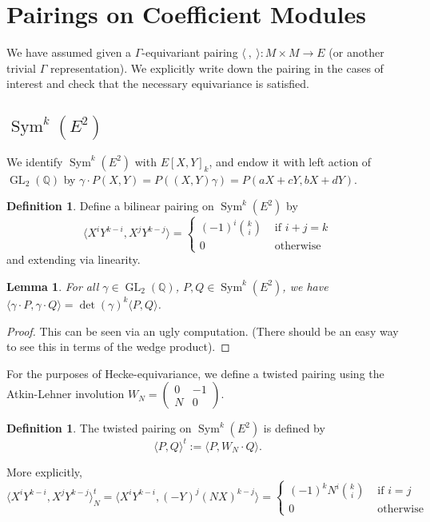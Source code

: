 \documentclass[10pt]{amsart}
\theoremstyle{plain}
\newtheorem{lemma}[theorem]{Lemma}
\theoremstyle{definition}
\newtheorem{definition}[theorem]{Definition}
\newcommand{\QQ}{{\mathbb{Q}}}
\DeclareMathOperator{\GL}{GL}
\DeclareMathOperator{\Sym}{Sym}
\begin{document}
\section{Pairings on Coefficient Modules} \label{sec:coeff_pairing}

We have assumed given a $\Gamma$-equivariant pairing $\langle~,~ \rangle : M \times M \longrightarrow E$ (or another trivial $\Gamma$ representation). We explicitly write down the pairing in the cases of interest and check that the necessary equivariance is satisfied. 

\subsection{$\Sym^k(E^2)$}

We identify $\Sym^k(E^2)$ with $E[X,Y]_k$, and endow it with left action of $\GL_2(\QQ)$ by $\gamma \cdot P(X,Y) = P((X,Y)\gamma)=P(aX+cY,bX+dY).$ 
\begin{definition}
Define a bilinear pairing on $\Sym^k(E^2)$ by
\begin{equation*}
	\langle X^iY^{k-i}, X^j Y^{k-j} \rangle = \begin{cases} (-1)^i {k \choose i} & \text{ if } i+j=k\\
												0	& \text{ otherwise} \end{cases}
\end{equation*}
and extending via linearity.
\end{definition}


\begin{lemma}
For all $\gamma\in \GL_2(\QQ)$, $P,Q\in\Sym^k(E^2)$, we have $\langle \gamma\cdot P,\gamma \cdot Q\rangle = \det(\gamma)^k \langle P,Q\rangle$.
\end{lemma}
\begin{proof}
This can be seen via an ugly computation. (There should be an easy way to see this in terms of the wedge product).
\end{proof}

For the purposes of Hecke-equivariance, we define a twisted pairing using the Atkin-Lehner involution $W_N = \begin{pmatrix} 0 & -1 \\ N & 0 \end{pmatrix}$.
\begin{definition}
The twisted pairing on $\Sym^k(E^2)$ is defined by
\begin{equation}
	\langle P, Q\rangle^t := \langle P, W_N \cdot Q\rangle.
\end{equation}
\end{definition}
More explicitly,
\begin{equation*}
	\langle X^iY^{k-i}, X^j Y^{k-j} \rangle_N^t = \langle X^i Y^{k-i}, (-Y)^j(NX)^{k-j}\rangle= \begin{cases} (-1)^k N^i {k \choose i} & \text{ if } i=j\\
												0	& \text{ otherwise} \end{cases}
\end{equation*}
\end{document}
